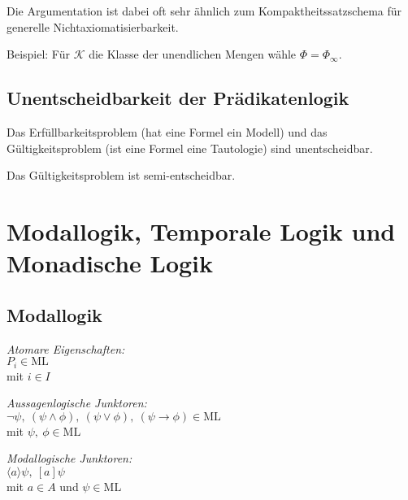 \documentclass{panikzettel}
\newcommand{\K}{\mathcal{K}}
\newcommand{\ML}{\mathrm{ML}}
\begin{document}
	Die Argumentation ist dabei oft sehr ähnlich zum Kompaktheitssatzschema für generelle Nichtaxiomatisierbarkeit.
	
	Beispiel: Für $\K$ die Klasse der unendlichen Mengen wähle $\Phi = \Phi_\infty$.

\subsection{Unentscheidbarkeit der Prädikatenlogik}

Das Erfüllbarkeitsproblem (\glqq hat eine Formel ein Modell\grqq) und das Gültigkeitsproblem (\glqq ist eine Formel eine Tautologie\grqq) sind unentscheidbar.

Das Gültigkeitsproblem ist semi-entscheidbar.

\section{Modallogik, Temporale Logik und Monadische Logik}

\subsection{Modallogik}

\begin{minipage}[t]{0.3\textwidth}
\begin{center}
\emph{Atomare Eigenschaften:} \\
$P_i \in \ML$ \\
mit $i \in I$
\end{center}
\end{minipage}
\begin{minipage}[t]{0.35\textwidth}
\begin{center}
\emph{Aussagenlogische Junktoren:} \\
$\neg \psi,\ (\psi \land \phi),\ (\psi \lor \phi),\ (\psi \to \phi) \in \ML$ \\
mit $\psi,\ \phi \in \ML$
\end{center}
\end{minipage}
\begin{minipage}[t]{0.35\textwidth}
\begin{center}
\emph{Modallogische Junktoren:} \\
$\langle a \rangle \psi,\ [a] \psi$ \\
mit $a \in A$ und $\psi \in \ML$
\end{center}
\end{minipage}
\ \\
\end{document}
